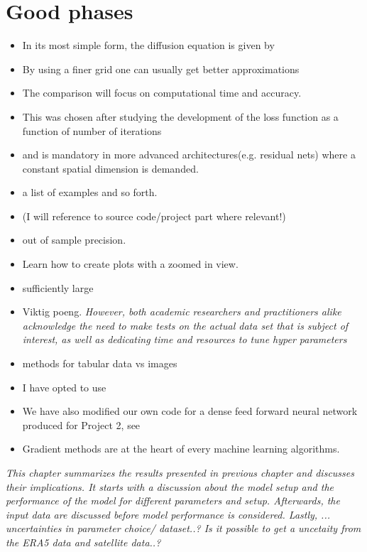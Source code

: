 \section{Good phases}
\begin{itemize}
    \item  In its most simple form, the diffusion equation is given by
    \item By using a finer grid one can usually get better approximations
    \item The comparison will focus on computational time and accuracy.
    \item This was chosen after
studying the development of the loss function as a function of number of iterations
    \item and is mandatory in
more advanced architectures(e.g. residual nets) where a constant spatial
dimension is demanded.
    \item a list of examples and so forth.
    \item (I will reference to source code/project part where relevant!)
    \item out of sample precision.
    \item Learn how to create plots with a zoomed in view.
    \item sufficiently large
    \item Viktig poeng. \textit{However, both academic
researchers and practitioners alike acknowledge the
need to make tests on the actual data set that is
subject of interest, as well as dedicating time and
resources to tune hyper parameters}
    \item methods for tabular data vs images
    \item I have opted to use
    \item We have also modified our own code for a dense feed forward neural
network produced for Project 2, see
    \item Gradient methods are at the heart of every machine learning algorithms. 
\end{itemize}


\textit{This chapter summarizes the results presented in previous chapter and discusses their implications. It starts with a discussion about the model setup and the performance of the model for different parameters and setup. Afterwards, the input data are discussed before model performance is considered. Lastly, ... uncertainties in parameter choice/ dataset..? Is it possible to get a uncetaity from the ERA5 data and satellite data..?} 


